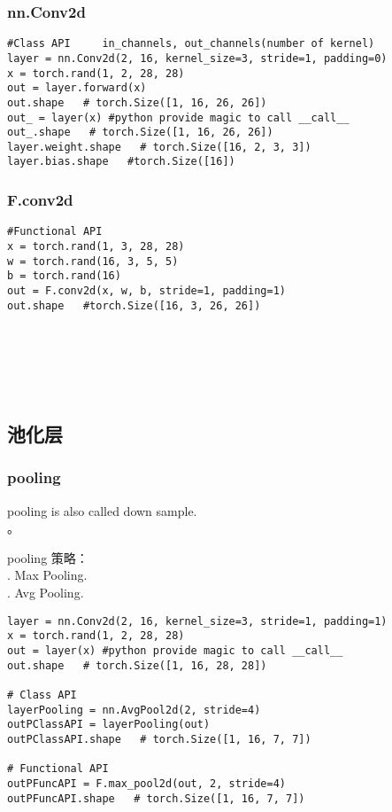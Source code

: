 \subsubsection{nn.Conv2d}
\begin{lstlisting}
#Class API     in_channels, out_channels(number of kernel)
layer = nn.Conv2d(2, 16, kernel_size=3, stride=1, padding=0)
x = torch.rand(1, 2, 28, 28)
out = layer.forward(x)
out.shape   # torch.Size([1, 16, 26, 26])
out_ = layer(x) #python provide magic to call __call__
out_.shape   # torch.Size([1, 16, 26, 26])
layer.weight.shape   # torch.Size([16, 2, 3, 3])
layer.bias.shape   #torch.Size([16])
\end{lstlisting}

\subsubsection{F.conv2d}
\begin{lstlisting}
#Functional API
x = torch.rand(1, 3, 28, 28)
w = torch.rand(16, 3, 5, 5)
b = torch.rand(16)
out = F.conv2d(x, w, b, stride=1, padding=1)
out.shape   #torch.Size([16, 3, 26, 26])
\end{lstlisting}
~\\
~\\
~\\
~\\


\subsection{池化层}
\subsubsection{pooling}
pooling is also called down sample. \\
。

\noindent pooling 策略：\\
. Max Pooling.\\
. Avg Pooling.
\begin{lstlisting}
layer = nn.Conv2d(2, 16, kernel_size=3, stride=1, padding=1)
x = torch.rand(1, 2, 28, 28)
out = layer(x) #python provide magic to call __call__
out.shape   # torch.Size([1, 16, 28, 28])

# Class API
layerPooling = nn.AvgPool2d(2, stride=4)
outPClassAPI = layerPooling(out)
outPClassAPI.shape   # torch.Size([1, 16, 7, 7])

# Functional API
outPFuncAPI = F.max_pool2d(out, 2, stride=4)
outPFuncAPI.shape   # torch.Size([1, 16, 7, 7])
\end{lstlisting}




